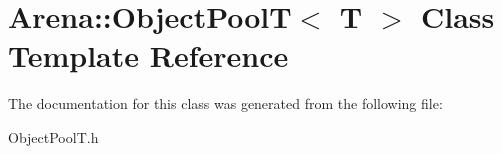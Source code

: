 \hypertarget{class_arena_1_1_object_pool_t}{\section{Arena\+:\+:Object\+Pool\+T$<$ T $>$ Class Template Reference}
\label{class_arena_1_1_object_pool_t}
}


The documentation for this class was generated from the following file\+:\begin{DoxyCompactItemize}
\item 
Object\+Pool\+T.\+h\end{DoxyCompactItemize}
